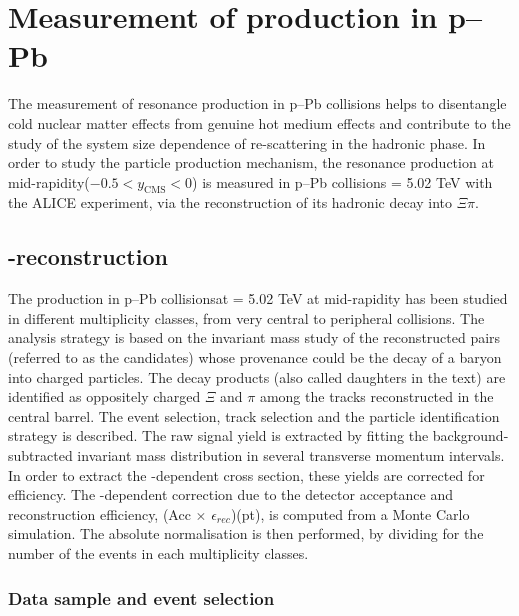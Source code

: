 \section{Measurement of \xis production in p--Pb}\label{sec:pPb}
The measurement of resonance production in p--Pb collisions helps to disentangle cold nuclear matter effects from genuine hot medium effects and contribute to the study of the system size dependence of re-scattering in the hadronic phase. In order to study the particle production mechanism, the \xis resonance production at mid-rapidity($-0.5<y_{\mathrm{CMS}}<0$) is measured in p--Pb collisions \snn = 5.02  TeV with the ALICE experiment, via the reconstruction of its hadronic decay into $\Xi\pi$.

\subsection{\xis-reconstruction}\label{sec:pPb:Reconstruction}
The \xiss production in p--Pb collisionsat \snn = 5.02 TeV  at mid-rapidity has been studied in different multiplicity classes, from very central to peripheral collisions. The analysis strategy is based on the invariant mass study of the reconstructed pairs (referred to as the candidates) whose provenance could be the decay of a \xiss baryon into charged particles. The decay products (also called daughters in the text) are identified as oppositely charged $\Xi$ and $\pi$ among the tracks reconstructed in the central barrel. The event selection, track selection and the particle identification strategy is described. The raw signal yield is extracted by fitting the background-subtracted invariant mass distribution in several transverse momentum intervals. In order to extract the \pt-dependent cross section, these yields are corrected for efficiency. The \pt-dependent correction due to the detector acceptance and reconstruction efficiency, (Acc $\times$ $\epsilon_{rec}$)(pt), is computed from a Monte Carlo simulation. The absolute normalisation is then performed, by dividing for the number of the events in each multiplicity classes.


\subsubsection{Data sample and event selection}\label{sec:pPb:Selection}


